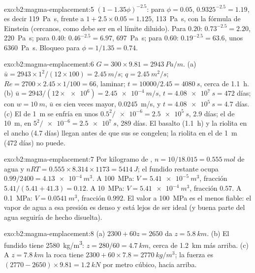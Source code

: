 \begin{solution}{exo:b2:magma-emplacement:5}
$(1 - 1.35\phi)^{-2.5}$: para $\phi = 0.05$, $0.9325^{-2.5} = 1.19$, es decir
\qty{119}{Pa.s}, frente a $1 + 2.5\times0.05 = 1.125$, \qty{113}{Pa.s}, con la fórmula de
Einstein (cercanos, como debe ser en el límite diluido). Para $0.20$: $0.73^{-2.5} =
2.20$, \qty{220}{Pa.s}; para $0.40$: $0.46^{-2.5} = 6.97$, \qty{697}{Pa.s}; para $0.60$:
$0.19^{-2.5} = 63.6$, unos \qty{6360}{Pa.s}. Bloqueo para $\phi = 1/1.35 = 0.74$.
\end{solution}

\begin{solution}{exo:b2:magma-emplacement:6}
$G = 300\times9.81 = \qty{2943}{Pa/m}$. (a) $\bar u = 2943\times1^2/(12\times100) =
\qty{2.45}{m/s}$; $q = \qty{2.45}{m^2/s}$; $Re = 2700\times2.45\times1/100 = 66$, laminar;
$t = 10000/2.45 = \qty{4080}{s}$, cerca de \qty{1.1}{h}. (b) $\bar u =
2943/(12\times\num{e6}) = \qty{2.45e-4}{m/s}$, $t = \qty{4.08e7}{s} = 472$ días; con
$w = \qty{10}{m}$, $\bar u$ es cien veces mayor, \qty{0.0245}{m/s}, y $t =
\qty{4.08e5}{s} = 4.7$ días. (c) El  de \qty{1}{m} se enfría en unos
$0.5^2/\num{e-6} = \qty{2.5e5}{s}$, 2.9 días; el  de \qty{10}{m}, en $5^2/\num{e-6} =
\qty{2.5e7}{s}$, 289 días. El basalto (\qty{1.1}{h}) y la riolita en el 
ancho (4.7 días) llegan antes de que sus  se congelen; la riolita en el
 de \qty{1}{m} (472 días) no puede.
\end{solution}

\begin{solution}{exo:b2:magma-emplacement:7}
Por kilogramo de , $n = 10/18.015 = \qty{0.555}{mol}$ de agua y $nRT =
0.555\times8.314\times1173 = \qty{5414}{J}$; el fundido restante ocupa $0.99/2400 =
\qty{4.13e-4}{m^3}$. A \qty{100}{MPa}: $V = \qty{5.41e-5}{m^3}$, fracción
$5.41/(5.41 + 41.3) = 0.12$. A \qty{10}{MPa}: $V = \qty{5.41e-4}{m^3}$, fracción
$0.57$. A \qty{0.1}{MPa}: $V = \qty{0.0541}{m^3}$, fracción $0.992$. El valor a
\qty{100}{MPa} es el menos fiable: el vapor de agua a esa presión es denso y
está lejos de ser ideal (y buena parte del agua seguiría de hecho disuelta).
\end{solution}

\begin{solution}{exo:b2:magma-emplacement:8}
(a) $2300 + 60z = 2650$ da $z = \qty{5.8}{km}$. (b) El fundido tiene
\qty{2580}{kg/m^3}: $z = 280/60 = \qty{4.7}{km}$, cerca de \qty{1.2}{km} más arriba. (c)
A $z = \qty{7.8}{km}$ la roca tiene $2300 + 60\times7.8 = \qty{2770}{kg/m^3}$; la
fuerza es $(2770 - 2650)\times9.81 = \qty{1.2}{kN}$ por metro cúbico, hacia arriba.
\end{solution}

